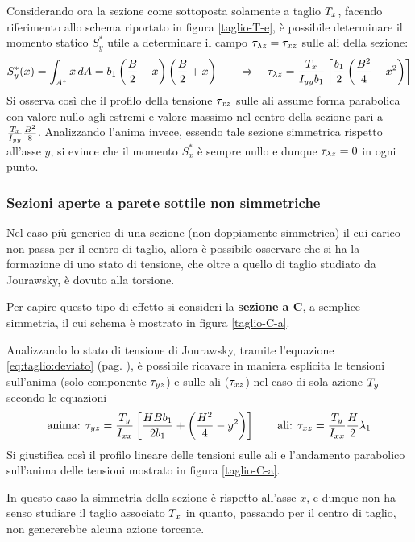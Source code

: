 		\vspace{3mm}
		Considerando ora la sezione come sottoposta solamente a taglio $T_x$, facendo riferimento allo schema riportato in figura \ref{taglio-T-e}, è possibile determinare il momento statico $S_y^*$ utile a determinare il campo $\tau_{\lambda z} = \tau_{xz}$ sulle ali della sezione:
		\[ S_y^*(x) = \int_{A^*} x \, dA = b_1\left( \frac B 2 -x\right) \left(\frac B 2 + x\right) \qquad \Rightarrow \quad \tau_{\lambda z} = \frac{T_x}{I_{yy} b_1}\left[\frac{b_1}{2} \left(\frac{B^2}{4}-x^2\right) \right] \]
		Si osserva così che il profilo della tensione $\tau_{xz}$ sulle ali assume forma parabolica con valore nullo agli estremi e valore massimo nel centro della sezione pari a $\frac {T_x} {I_{yy}} \frac {B^2}8$. Analizzando l'anima invece, essendo tale sezione simmetrica rispetto all'asse $y$, si evince che il momento $S_x^*$ è sempre nullo e dunque $\tau_{\lambda z} = 0$ in ogni punto.
	
	\subsubsection{Sezioni aperte a parete sottile non simmetriche}
		Nel caso più generico di una sezione (non doppiamente simmetrica) il cui carico non passa per il centro di taglio, allora è possibile osservare che si ha la formazione di uno stato di tensione, che oltre a quello di taglio studiato da Jourawsky,  è dovuto alla torsione.
		
		Per capire questo tipo di effetto si consideri la \textbf{sezione a C}, a semplice simmetria, il cui schema è mostrato in figura \ref{taglio-C-a}.
		
		
		Analizzando lo stato di tensione di Jourawsky, tramite l'equazione \ref{eq:taglio:deviato} (pag. \pageref{eq:taglio:deviato}), è possibile ricavare in maniera esplicita le tensioni sull'anima (solo componente $\tau_{yz}$) e sulle ali ($\tau_{xz}$) nel caso di sola azione $T_y$ secondo le equazioni
		\[ \textrm{anima: } \tau_{yz} = \frac {T_y} {I_{xx}} \left[ \frac{HBb_1}{2b_1} + \left(\frac {H^2}4 - y^2\right) \right] \qquad \textrm{ali: } \tau_{xz} =\frac {T_y}{I_{xx}} \frac H 2 \lambda_1 \]
		Si giustifica così il profilo lineare delle tensioni sulle ali e l'andamento parabolico sull'anima delle tensioni mostrato in figura \ref{taglio-C-a}.
		\begin{nota}
			In questo caso la simmetria della sezione è rispetto all'asse $x$, e dunque non ha senso studiare il taglio associato $T_x$ in quanto, passando per il centro di taglio, non genererebbe alcuna azione torcente.
		\end{nota}
		
